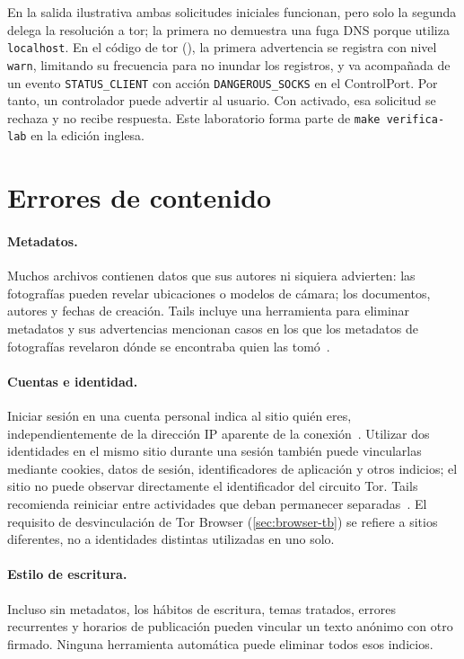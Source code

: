 En la salida ilustrativa ambas solicitudes iniciales funcionan, pero solo la segunda delega la resolución a tor; la primera no demuestra una fuga DNS porque utiliza \texttt{localhost}. En el código de tor (), la primera advertencia se registra con nivel \texttt{warn}, limitando su frecuencia para no inundar los registros, y va acompañada de un evento \texttt{STATUS\_CLIENT} con acción \texttt{DANGEROUS\_SOCKS} en el ControlPort. Por tanto, un controlador puede advertir al usuario. Con  activado, esa solicitud se rechaza y  no recibe respuesta. Este laboratorio forma parte de \texttt{make verifica-lab} en la edición inglesa.

\section{Errores de contenido}\label{sec:opsec-contenuto}

\paragraph{Metadatos.} Muchos archivos contienen datos que sus autores ni siquiera advierten: las fotografías pueden revelar ubicaciones o modelos de cámara; los documentos, autores y fechas de creación. Tails incluye una herramienta para eliminar metadatos y sus advertencias mencionan casos en los que los metadatos de fotografías revelaron dónde se encontraba quien las tomó~\cite{tailswarnings}.

\paragraph{Cuentas e identidad.} Iniciar sesión en una cuenta personal indica al sitio quién eres, independientemente de la dirección IP aparente de la conexión~\cite{torsafety}. Utilizar dos identidades en el mismo sitio durante una sesión también puede vincularlas mediante cookies, datos de sesión, identificadores de aplicación y otros indicios; el sitio no puede observar directamente el identificador del circuito Tor. Tails recomienda reiniciar entre actividades que deban permanecer separadas~\cite{tailswarnings}. El requisito de desvinculación de Tor Browser (\cref{sec:browser-tb}) se refiere a sitios diferentes, no a identidades distintas utilizadas en uno solo.

\paragraph{Estilo de escritura.} Incluso sin metadatos, los hábitos de escritura, temas tratados, errores recurrentes y horarios de publicación pueden vincular un texto anónimo con otro firmado. Ninguna herramienta automática puede eliminar todos esos indicios.

